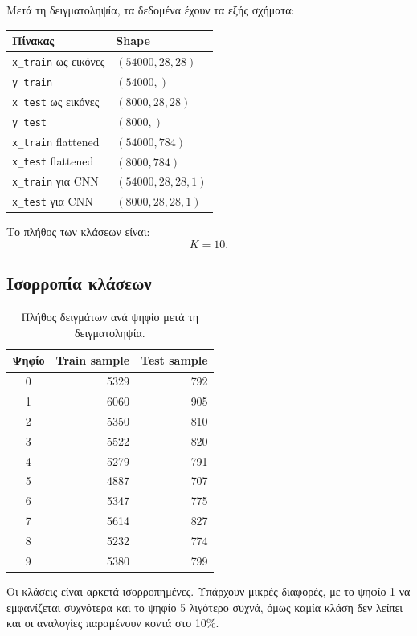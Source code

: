 \documentclass[12pt,a4paper]{article}
\newcommand{\code}[1]{\texttt{\textenglish{#1}}}
\begin{document}
Μετά τη δειγματοληψία, τα δεδομένα έχουν τα εξής σχήματα:

\begin{center}
\begin{tabular}{ll}
\toprule
\textbf{Πίνακας} & \textbf{Shape} \\
\midrule
\code{x\_train} ως εικόνες & \((54000, 28, 28)\) \\
\code{y\_train} & \((54000,)\) \\
\code{x\_test} ως εικόνες & \((8000, 28, 28)\) \\
\code{y\_test} & \((8000,)\) \\
\code{x\_train} flattened & \((54000, 784)\) \\
\code{x\_test} flattened & \((8000, 784)\) \\
\code{x\_train} για CNN & \((54000, 28, 28, 1)\) \\
\code{x\_test} για CNN & \((8000, 28, 28, 1)\) \\
\bottomrule
\end{tabular}
\end{center}

Το πλήθος των κλάσεων είναι:
\[
    K = 10.
\]

\subsection{Ισορροπία κλάσεων}

\begin{table}[H]
\centering
\caption{Πλήθος δειγμάτων ανά ψηφίο μετά τη δειγματοληψία.}
\begin{tabular}{crr}
\toprule
\textbf{Ψηφίο} & \textbf{Train sample} & \textbf{Test sample} \\
\midrule
0 & 5329 & 792 \\
1 & 6060 & 905 \\
2 & 5350 & 810 \\
3 & 5522 & 820 \\
4 & 5279 & 791 \\
5 & 4887 & 707 \\
6 & 5347 & 775 \\
7 & 5614 & 827 \\
8 & 5232 & 774 \\
9 & 5380 & 799 \\
\bottomrule
\end{tabular}
\end{table}

Οι κλάσεις είναι αρκετά ισορροπημένες. Υπάρχουν μικρές διαφορές, με το ψηφίο
1 να εμφανίζεται συχνότερα και το ψηφίο 5 λιγότερο συχνά, όμως καμία κλάση δεν
λείπει και οι αναλογίες παραμένουν κοντά στο 10\%.
\end{document}
